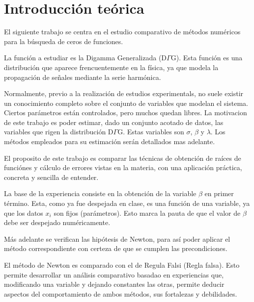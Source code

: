\section{Introducci\'on te\'orica}

El siguiente trabajo se centra en el estudio comparativo de m\'etodos
num\'ericos para la b\'usqueda de ceros de funciones. 

La funci\'on a estudiar es la Digamma Generalizada (D$\Gamma$G). 
Esta funci\'on es una distribuci\'on que aparece frencuentemente en la f\'isica,
ya que modela la propagaci\'on de se\~nales mediante la serie harm\'onica.

Normalmente, previo a la realizaci\'on de estudios experimentals, no suele
existir un conocimiento completo sobre el conjunto de variables que modelan
el sistema. Ciertos par\'ametros est\'an controlados, pero muchos quedan libres. 
La motivacion de este trabajo es poder estimar, dado un conjunto acotado de datos, 
las variables que rigen la distribuci\'on D$\Gamma$G. 
Estas variables son $\sigma$, $\beta$ y $\lambda$. Los m\'etodos empleados para 
su estimaci\'on ser\'an detallados mas adelante.

El proposito de este trabajo es comparar las t\'ecnicas de obtenci\'on de ra\'ices 
de funci\'ones y c\'alculo de errores vistas en la materia, 
con una aplicaci\'on pr\'actica, concreta y sencilla de entender.

La base de la experiencia consiste en la obtenci\'on de la variable $\beta$ en
primer t\'ermino. Esta, como ya fue despejada en clase, es una funci\'on
de una variable, ya que los datos $x_i$ son fijos (par\'ametros). 
Esto marca la pauta de que el valor de $\beta$ debe ser despejado
num\'ericamente. 

M\'as adelante se verifican las hip\'otesis de Newton, para as\'i poder aplicar
el m\'etodo correspondiente con certeza de que se cumplen las precondiciones.

El m\'etodo de Newton es comparado con el de Regula Falsi (Regla falsa). Esto
permite desarrollar un an\'alisis comparativo basadao en experiencias que,
modificando una variable y dejando constantes las otras, permite deducir
aspectos del comportamiento de ambos m\'etodos, sus fortalezas y debilidades.
